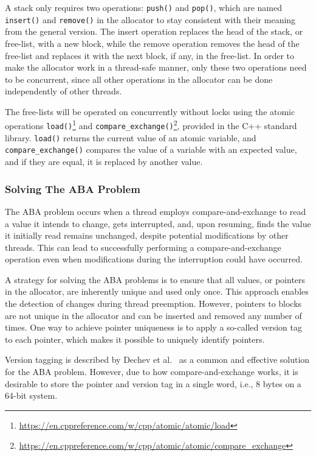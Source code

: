 A stack only requires two operations: \texttt{push()} and \texttt{pop()}, which are named \texttt{insert()} and \texttt{remove()} in the allocator to stay consistent with their meaning from the general version. The insert operation replaces the head of the stack, or free-list, with a new block, while the remove operation removes the head of the free-list and replaces it with the next block, if any, in the free-list. In order to make the allocator work in a thread-safe manner, only these two operations need to be concurrent, since all other operations in the allocator can be done independently of other threads.

The free-lists will be operated on concurrently without locks using the atomic operations \texttt{load()}\footnote{\url{https://en.cppreference.com/w/cpp/atomic/atomic/load}} and \texttt{compare\_exchange()}\footnote{\url{https://en.cppreference.com/w/cpp/atomic/atomic/compare_exchange}}, provided in the C++ standard library. \texttt{load()} returns the current value of an atomic variable, and \texttt{compare\_exchange()} compares the value of a variable with an expected value, and if they are equal, it is replaced by another value.

\subsubsection{Solving The ABA Problem}
\label{sec:adaptations_impl:aba_problem}

The ABA problem occurs when a thread employs compare-and-exchange to read a value it intends to change, gets interrupted, and, upon resuming, finds the value it initially read remains unchanged, despite potential modifications by other threads. This can lead to successfully performing a compare-and-exchange operation even when modifications during the interruption could have occurred.

A strategy for solving the ABA problems is to ensure that all values, or pointers in the allocator, are inherently unique and used only once. This approach enables the detection of changes during thread preemption. However, pointers to blocks are not unique in the allocator and can be inserted and removed any number of times. One way to achieve pointer uniqueness is to apply a so-called version tag to each pointer, which makes it possible to uniquely identify pointers.

Version tagging is described by Dechev et al.~\cite{bjarne_aba} as a common and effective solution for the ABA problem. However, due to how compare-and-exchange works, it is desirable to store the pointer and version tag in a single word, i.e., 8 bytes on a 64-bit system. 

